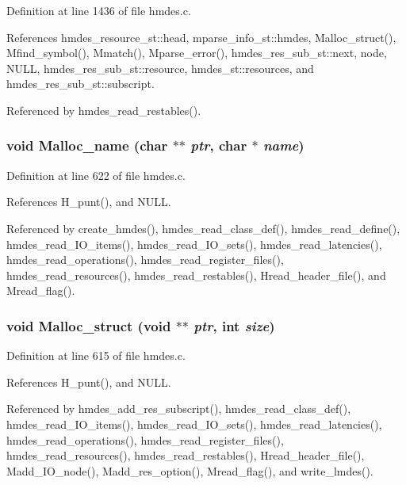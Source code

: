 Definition at line 1436 of file hmdes.c.

References hmdes\_\-resource\_\-st::head, mparse\_\-info\_\-st::hmdes, Malloc\_\-struct(), Mfind\_\-symbol(), Mmatch(), Mparse\_\-error(), hmdes\_\-res\_\-sub\_\-st::next, node, NULL, hmdes\_\-res\_\-sub\_\-st::resource, hmdes\_\-st::resources, and hmdes\_\-res\_\-sub\_\-st::subscript.

Referenced by hmdes\_\-read\_\-restables().
\subsubsection{\setlength{\rightskip}{0pt plus 5cm}void Malloc\_\-name (char $\ast$$\ast$ {\em ptr}, char $\ast$ {\em name})}\label{hmdes_8h_94186a85a4489b80b7d305e6e13fec4c}




Definition at line 622 of file hmdes.c.

References H\_\-punt(), and NULL.

Referenced by create\_\-hmdes(), hmdes\_\-read\_\-class\_\-def(), hmdes\_\-read\_\-define(), hmdes\_\-read\_\-IO\_\-items(), hmdes\_\-read\_\-IO\_\-sets(), hmdes\_\-read\_\-latencies(), hmdes\_\-read\_\-operations(), hmdes\_\-read\_\-register\_\-files(), hmdes\_\-read\_\-resources(), hmdes\_\-read\_\-restables(), Hread\_\-header\_\-file(), and Mread\_\-flag().
\subsubsection{\setlength{\rightskip}{0pt plus 5cm}void Malloc\_\-struct (void $\ast$$\ast$ {\em ptr}, int {\em size})}\label{hmdes_8h_44598a63bd3f29a90fdd27cb3531aff7}




Definition at line 615 of file hmdes.c.

References H\_\-punt(), and NULL.

Referenced by hmdes\_\-add\_\-res\_\-subscript(), hmdes\_\-read\_\-class\_\-def(), hmdes\_\-read\_\-IO\_\-items(), hmdes\_\-read\_\-IO\_\-sets(), hmdes\_\-read\_\-latencies(), hmdes\_\-read\_\-operations(), hmdes\_\-read\_\-register\_\-files(), hmdes\_\-read\_\-resources(), hmdes\_\-read\_\-restables(), Hread\_\-header\_\-file(), Madd\_\-IO\_\-node(), Madd\_\-res\_\-option(), Mread\_\-flag(), and write\_\-lmdes().
